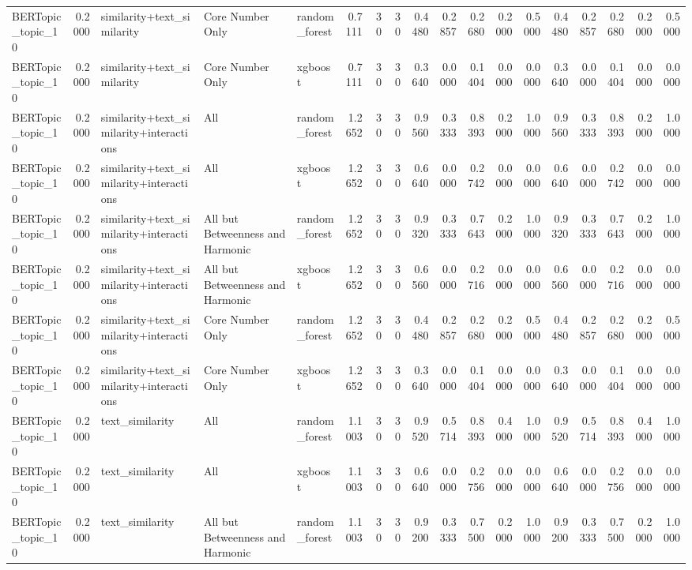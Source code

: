 \begin{tabular}{lrlllrrrrrrrrrrrrr}
BERTopic_topic_10 & 0.2000 & similarity+text_similarity & Core Number Only & random_forest & 0.7111 & 30 & 30 & 0.4480 & 0.2857 & 0.2680 & 0.2000 & 0.5000 & 0.4480 & 0.2857 & 0.2680 & 0.2000 & 0.5000 \\
BERTopic_topic_10 & 0.2000 & similarity+text_similarity & Core Number Only & xgboost & 0.7111 & 30 & 30 & 0.3640 & 0.0000 & 0.1404 & 0.0000 & 0.0000 & 0.3640 & 0.0000 & 0.1404 & 0.0000 & 0.0000 \\
BERTopic_topic_10 & 0.2000 & similarity+text_similarity+interactions & All & random_forest & 1.2652 & 30 & 30 & 0.9560 & 0.3333 & 0.8393 & 0.2000 & 1.0000 & 0.9560 & 0.3333 & 0.8393 & 0.2000 & 1.0000 \\
BERTopic_topic_10 & 0.2000 & similarity+text_similarity+interactions & All & xgboost & 1.2652 & 30 & 30 & 0.6640 & 0.0000 & 0.2742 & 0.0000 & 0.0000 & 0.6640 & 0.0000 & 0.2742 & 0.0000 & 0.0000 \\
BERTopic_topic_10 & 0.2000 & similarity+text_similarity+interactions & All but Betweenness and Harmonic & random_forest & 1.2652 & 30 & 30 & 0.9320 & 0.3333 & 0.7643 & 0.2000 & 1.0000 & 0.9320 & 0.3333 & 0.7643 & 0.2000 & 1.0000 \\
BERTopic_topic_10 & 0.2000 & similarity+text_similarity+interactions & All but Betweenness and Harmonic & xgboost & 1.2652 & 30 & 30 & 0.6560 & 0.0000 & 0.2716 & 0.0000 & 0.0000 & 0.6560 & 0.0000 & 0.2716 & 0.0000 & 0.0000 \\
BERTopic_topic_10 & 0.2000 & similarity+text_similarity+interactions & Core Number Only & random_forest & 1.2652 & 30 & 30 & 0.4480 & 0.2857 & 0.2680 & 0.2000 & 0.5000 & 0.4480 & 0.2857 & 0.2680 & 0.2000 & 0.5000 \\
BERTopic_topic_10 & 0.2000 & similarity+text_similarity+interactions & Core Number Only & xgboost & 1.2652 & 30 & 30 & 0.3640 & 0.0000 & 0.1404 & 0.0000 & 0.0000 & 0.3640 & 0.0000 & 0.1404 & 0.0000 & 0.0000 \\
BERTopic_topic_10 & 0.2000 & text_similarity & All & random_forest & 1.1003 & 30 & 30 & 0.9520 & 0.5714 & 0.8393 & 0.4000 & 1.0000 & 0.9520 & 0.5714 & 0.8393 & 0.4000 & 1.0000 \\
BERTopic_topic_10 & 0.2000 & text_similarity & All & xgboost & 1.1003 & 30 & 30 & 0.6640 & 0.0000 & 0.2756 & 0.0000 & 0.0000 & 0.6640 & 0.0000 & 0.2756 & 0.0000 & 0.0000 \\
BERTopic_topic_10 & 0.2000 & text_similarity & All but Betweenness and Harmonic & random_forest & 1.1003 & 30 & 30 & 0.9200 & 0.3333 & 0.7500 & 0.2000 & 1.0000 & 0.9200 & 0.3333 & 0.7500 & 0.2000 & 1.0000 \\

\end{tabular}
